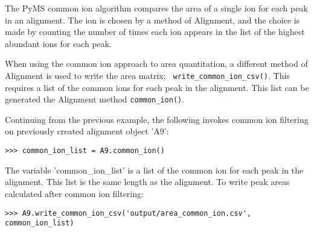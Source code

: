 The PyMS common ion algorithm compares the area of a single ion for each
peak in an alignment. The ion is chosen by a method of Alignment, and the 
choice is made by counting the number of times each ion appears in the
list of the highest abundant ions for each peak.

When using the common ion approach to area quantitation, a different
method of Alignment is used to write the area matrix; {\tt
write\_common\_ion\_csv()}. This requires a list of the common ions
for each peak in the alignment. This list can be generated the
Alignment method {\tt common\_ion()}.

Continuing from the previous example, the following invokes common ion
filtering on previously created alignment object 'A9':

\begin{verbatim}
>>> common_ion_list = A9.common_ion()
\end{verbatim}

The variable 'common\_ion\_list' is a list of the common ion for each
peak in the alignment. This list is the same length as the alignment.
To write peak areas calculated after common ion filtering:

\begin{verbatim}
>>> A9.write_common_ion_csv('output/area_common_ion.csv', common_ion_list)
\end{verbatim}

